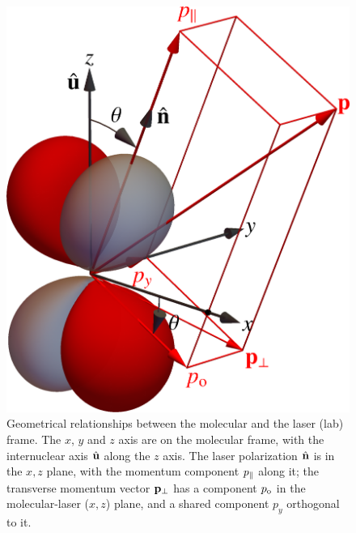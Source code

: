 \begin{figure}[htb]
  \centering
  \includegraphics[scale=1]{2-ARM-theory/Figures/figure2F.png}
  \caption[Geometrical relationships between the molecular and the laser reference frames]{
  Geometrical relationships between the molecular and the laser (lab) frame. The $x$, $y$ and $z$ axis are on the molecular frame, with the internuclear axis $\hat{\vb{u}}$ along the $z$ axis. The laser polarization $\hat{\vb{n}}$ is in the $x,z$ plane, with the momentum component ${p_{\parallel}}$ along it; the transverse momentum vector ${\vb{p}_{\perp}}$ has a component ${p_\mathrm{o}}$ in the molecular-laser ($x,z$) plane, and a shared component $p_y$ orthogonal to it.
  }
  \label{f2-molecular-frame}
\end{figure}




